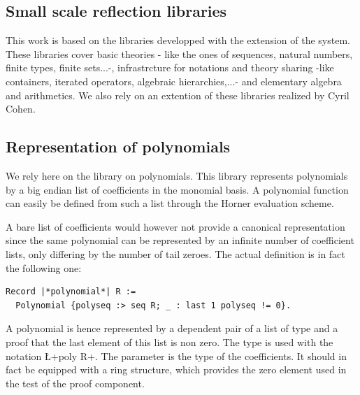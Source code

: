 \documentclass{mscs}
\begin{document}

\subsection{Small scale reflection libraries}
This work is based on the \ssr{} libraries \cite{ssrsite}
developped with the \ssr{} extension
\cite{GONTHIER:2008:INRIA-00258384:4} of the \Coq{} system.
These libraries cover basic theories - like the ones of sequences, natural
numbers, finite types, finite sets...-, infrastrcture for notations and
theory sharing -like containers, iterated operators, algebraic
hierarchies,...- and elementary algebra and arithmetics. We also rely
on an extention of these libraries realized by Cyril Cohen.




\subsection{Representation of polynomials}

We rely here on the \ssr{} library on polynomials. This library
represents polynomials by a big endian list of coefficients in
the monomial basis. A polynomial function can easily be defined from
such a list through the Horner evaluation scheme.

A bare list of coefficients would however not
provide a canonical representation since the same
polynomial can be represented by an infinite number of coefficient
lists, only differing by the number of tail zeroes. The actual
definition is in fact the following one:
\begin{lstlisting}
Record |*polynomial*| R :=
  Polynomial {polyseq :> seq R; _ : last 1 polyseq != 0}.
\end{lstlisting}
A polynomial is hence
represented by a dependent pair of a list  of type  and a
proof that the last element of this list is non zero. The type
 is used with the notation \L+{poly R}+. The
parameter  is the type of the coefficients. It should in fact
be equipped with a ring structure, which provides the zero element
used in the test of the proof component.
\end{document}
